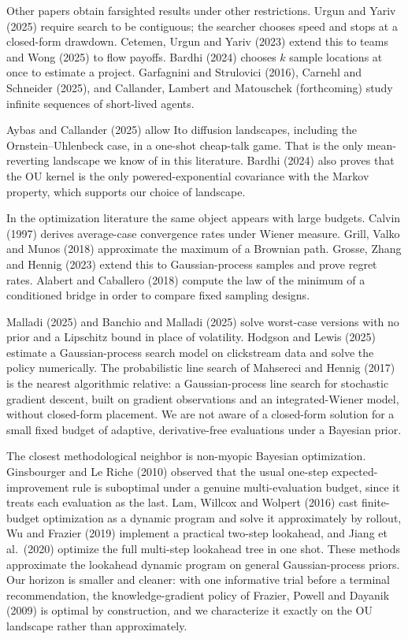 \documentclass[11pt]{article}
\theoremstyle{itheads}
\begin{document}
Other papers obtain farsighted results under other restrictions.
Urgun and Yariv (2025) require search to be contiguous; the searcher
chooses speed and stops at a closed-form drawdown. Cetemen, Urgun
and Yariv (2023) extend this to teams and Wong (2025) to flow
payoffs. Bardhi (2024) chooses $k$ sample locations at once to
estimate a project. Garfagnini and Strulovici (2016), Carnehl and
Schneider (2025), and Callander, Lambert and Matouschek
(forthcoming) study infinite sequences of short-lived agents.

Aybas and Callander (2025) allow Ito diffusion landscapes, including the
Ornstein--Uhlenbeck case, in a one-shot cheap-talk game. That is the
only mean-reverting landscape we know of in this literature. Bardhi
(2024) also proves that the OU kernel is the only powered-exponential
covariance with the Markov property, which supports our choice of
landscape.

In the optimization literature the same object appears with large
budgets. Calvin (1997) derives average-case convergence rates under
Wiener measure. Grill, Valko and Munos (2018) approximate the
maximum of a Brownian path. Grosse, Zhang and Hennig (2023) extend
this to Gaussian-process samples and prove regret rates. Alabert and
Caballero (2018) compute the law of the minimum of a conditioned
bridge in order to compare fixed sampling designs.

Malladi (2025) and Banchio and Malladi (2025) solve worst-case versions with no
prior and a Lipschitz bound in place of volatility. Hodgson and
Lewis (2025) estimate a Gaussian-process search model on clickstream
data and solve the policy numerically. The probabilistic line search of Mahsereci and Hennig (2017) is the
nearest algorithmic relative: a Gaussian-process line search for
stochastic gradient descent, built on gradient observations and an
integrated-Wiener model, without closed-form placement. We are not
aware of a closed-form solution for a small fixed budget of
adaptive, derivative-free evaluations under a Bayesian prior.

The closest methodological neighbor is non-myopic Bayesian
optimization. Ginsbourger and Le Riche (2010) observed that the usual
one-step expected-improvement rule is suboptimal under a genuine
multi-evaluation budget, since it treats each evaluation as the last.
Lam, Willcox and Wolpert (2016) cast finite-budget optimization as a
dynamic program and solve it approximately by rollout, Wu and Frazier
(2019) implement a practical two-step lookahead, and Jiang et al.\
(2020) optimize the full multi-step lookahead tree in one shot. These
methods approximate the lookahead dynamic program on general
Gaussian-process priors. Our horizon is smaller and cleaner: with one
informative trial before a terminal recommendation, the
knowledge-gradient policy of Frazier, Powell and Dayanik (2009) is
optimal by construction, and we characterize it exactly on the OU
landscape rather than approximately.
\end{document}
